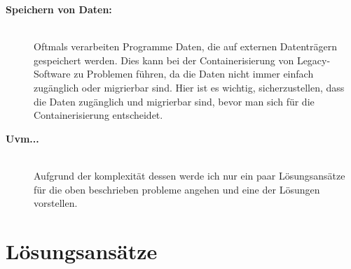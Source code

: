 \begin{description}
	\item[\textbf{Speichern von Daten:}]\hfill \\ Oftmals verarbeiten Programme Daten, die auf externen Datenträgern gespeichert werden. Dies kann bei der Containerisierung von Legacy-Software zu Problemen führen, da die Daten nicht immer einfach zugänglich oder migrierbar sind. Hier ist es wichtig, sicherzustellen, dass die Daten zugänglich und migrierbar sind, bevor man sich für die Containerisierung entscheidet. \\
	\item[\textbf{Uvm...}]\hfill \\ Aufgrund der komplexität dessen werde ich nur ein paar Lösungsansätze für die oben beschrieben probleme angehen und eine der Lösungen vorstellen. \\
\end{description}

\section{Lösungsansätze}

